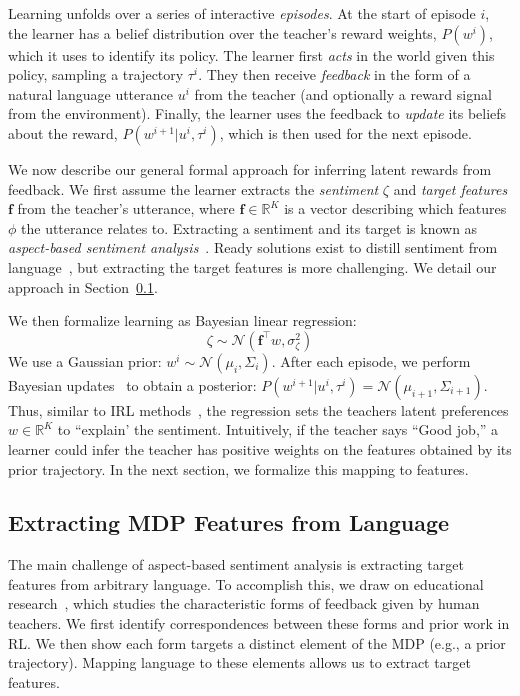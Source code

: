 \documentclass[letterpaper]{article} %
\begin{document}
Learning unfolds over a series of interactive \textit{episodes}.
At the start of episode $i$, the learner has a belief distribution over the teacher's reward weights, $P(w^{i})$, which it uses to identify its policy.
The learner first \emph{acts} in the world given this policy, sampling a trajectory $\tau^i$.
They then receive \emph{feedback} in the form of a natural language utterance $u^i$ from the teacher (and optionally a reward signal from the environment). Finally, the learner uses the feedback to \emph{update} its beliefs about the reward, $P(w^{i+1} | u^i, \tau^i)$, which is then used for the next episode.

We now describe our general formal approach for inferring latent rewards from feedback. We first assume the learner extracts the \textit{sentiment} $\zeta$ and \textit{target features} $\mathbf{f}$ from the teacher's utterance, where $\mathbf{f} \in \mathbb{R}^K$ is a vector describing which features $\phi$ the utterance relates to. Extracting a sentiment and its target is known as \textit{aspect-based sentiment analysis}~\cite{liu2020sentiment}. Ready solutions exist to distill sentiment from  language~\cite{HuttoG14, Kim_2014}, but extracting the target features is more challenging. We detail our approach in Section~\ref{forms_of_feedback_section}.

We then formalize learning as Bayesian linear regression:
\begin{equation}
    \zeta \sim \mathcal{N}(\mathbf{f}^{\top} w, \sigma_\zeta^2)
    \label{bayesian_lr_equation}
\end{equation}
We use a Gaussian prior: $w^i \sim \mathcal{N}(\mu_i, \Sigma_i)$. After each episode, we perform Bayesian updates~\cite{murphy_2007} to obtain a posterior: $P(w^{i+1} | u^i, \tau^i) = \mathcal{N}(\mu_{i+1},\Sigma_{i+1})$. Thus, similar to IRL methods~\citep{ramachandran2007bayesian}, the regression sets the teachers latent preferences $w \in \mathbb{R}^K$ to ``explain' the sentiment. Intuitively, if the teacher says ``Good job,'' a learner could infer the teacher has positive weights on the features obtained by its prior trajectory. In the next section, we formalize this mapping to features.

\subsection{Extracting MDP Features from Language}
\label{forms_of_feedback_section}
The main challenge of aspect-based sentiment analysis is extracting target features from arbitrary language. To accomplish this, we draw on educational research~\citep{Lipnevich_education, shute_2008}, which studies the characteristic forms of feedback given by human teachers. We first identify correspondences between these forms and prior work in RL. We then show each form targets a distinct element of the MDP (e.g., a prior trajectory). Mapping language to these elements allows us to extract target features.
\end{document}
